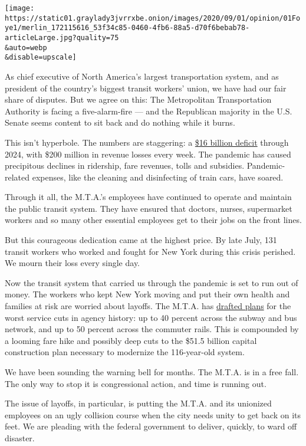 \texttt{[image: https://static01.graylady3jvrrxbe.onion/images/2020/09/01/opinion/01Foye1/merlin\_172115616\_53f34c85-0460-4fb6-88a5-d70f6bebab78-articleLarge.jpg?quality=75\\\&auto=webp\\\&disable=upscale]}

As chief executive of North America's largest transportation system, and
as president of the country's biggest transit workers' union, we have
had our fair share of disputes. But we agree on this: The Metropolitan
Transportation Authority is facing a five-alarm-fire --- and the
Republican majority in the U.S. Senate seems content to sit back and do
nothing while it burns.

This isn't hyperbole. The numbers are staggering: a
\href{http://www.mta.info/press-release/mta-headquarters/us-senate-considers-coronavirus-relief-bill-mta-details-16-billion}{\$16
billion deficit} through 2024, with \$200 million in revenue losses
every week. The pandemic has caused precipitous declines in ridership,
fare revenues, tolls and subsidies. Pandemic-related expenses, like the
cleaning and disinfecting of train cars, have soared.

Through it all, the M.T.A.'s employees have continued to operate and
maintain the public transit system. They have ensured that doctors,
nurses, supermarket workers and so many other essential employees get to
their jobs on the front lines.

But this courageous dedication came at the highest price. By late July,
131 transit workers who worked and fought for New York during this
crisis perished. We mourn their loss every single day.

Now the transit system that carried us through the pandemic is set to
run out of money. The workers who kept New York moving and put their own
health and families at risk are worried about layoffs. The M.T.A. has
\href{https://www.nytimes3xbfgragh.onion/2020/08/26/nyregion/nyc-subway-bus-service-cuts.html}{drafted
plans} for the worst service cuts in agency history: up to 40 percent
across the subway and bus network, and up to 50 percent across the
commuter rails. This is compounded by a looming fare hike and possibly
deep cuts to the \$51.5 billion capital construction plan necessary to
modernize the 116-year-old system.

We have been sounding the warning bell for months. The M.T.A. is in a
free fall. The only way to stop it is congressional action, and time is
running out.

The issue of layoffs, in particular, is putting the M.T.A. and its
unionized employees on an ugly collision course when the city needs
unity to get back on its feet. We are pleading with the federal
government to deliver, quickly, to ward off disaster.

